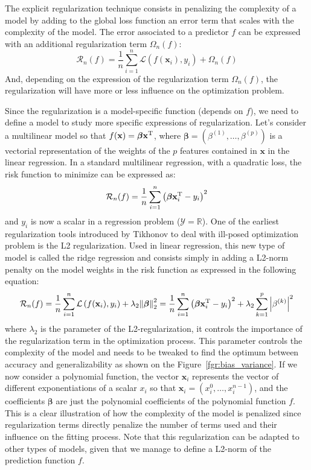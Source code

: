 \documentclass[main]{subfiles}
\begin{document}
The explicit regularization technique consists in penalizing the complexity of a model by adding to the global loss function an error term that scales with the complexity of the model. The error associated to a predictor $f$ can be expressed with an additional regularization term ${\Omega}_n(f)$:
\begin{equation}
  \mathcal{R}_n(f) = \frac{1}{n}\sum_{i=1}^n \mathcal{L}\left(f(\mathbf{x}_i),y_i\right) + \Omega_n(f)
\end{equation}
And, depending on the expression of the regularization term ${\Omega}_n(f)$, the regularization will have more or less influence on the optimization problem. 

Since the regularization is a model-specific function (depends on $f$), we need to define a model to study more specific expressions of regularization. 
Let's consider a multilinear model so that $f(\mathbf{x}) = \boldsymbol{\beta}\mathbf{x}^{\text{T}}$, where $\boldsymbol{\beta}=(\beta^{(1)},\ldots,\beta^{(p)})$ is a vectorial representation of the weights of the $p$ features contained in $\mathbf{x}$ in the linear regression. In a standard multilinear regression, with a quadratic loss, the risk function to minimize can be expressed as:
\begin{equation}\label{eq:linear}
  \mathcal{R}_n(f) = \frac{1}{n}\sum_{i=1}^n {\left(\boldsymbol{\beta}\mathbf{x}_i^{\text{T}}-y_i\right)}^2 
\end{equation}
and $y_i$ is now a scalar in a regression problem ($\mathcal{Y}=\mathbb{R}$). One of the earliest regularization tools introduced by Tikhonov to deal with ill-posed optimization problem is the L2 regularization. Used in linear regression, this new type of model is called the ridge regression and consists simply in adding a L2-norm penalty on the model weights in the risk function as expressed in the following equation:
\begin{equation}\label{eq:L2_reg}
  \mathcal{R}_n(f) = \frac{1}{n}\sum_{i=1}^n \mathcal{L}\left(f(\mathbf{x}_i),y_i\right) + \lambda_2 {\lVert \boldsymbol{\beta} \rVert}_2^2 = \frac{1}{n}\sum_{i=1}^n {\left(\boldsymbol{\beta}\mathbf{x}_i^{\text{T}}-y_i\right)}^2 + \lambda_2 \sum_{k=1}^p \left|\beta^{(k)}\right|^2
\end{equation}
where $\lambda_2$ is the parameter of the L2-regularization, it controls the importance of the regularization term in the optimization process. This parameter controls the complexity of the model and needs to be tweaked to find the optimum between accuracy and generalizability as shown on the Figure~\ref{fgr:bias_variance}. If we now consider a polynomial function, the vector $\mathbf{x}_i$ represents the vector of different exponentiations of a scalar $x_i$ so that $\mathbf{x}_i=\left(x_i^0,\ldots,x_i^{n-1}\right)$, and the coefficients $\boldsymbol{\beta}$ are just the polynomial coefficients of the polynomial function $f$. This is a clear illustration of how the complexity of the model is penalized since regularization terms directly penalize the number of terms used and their influence on the fitting process.
Note that this regularization can be adapted to other types of models, given that we manage to define a L2-norm of the prediction function $f$.
\end{document}
